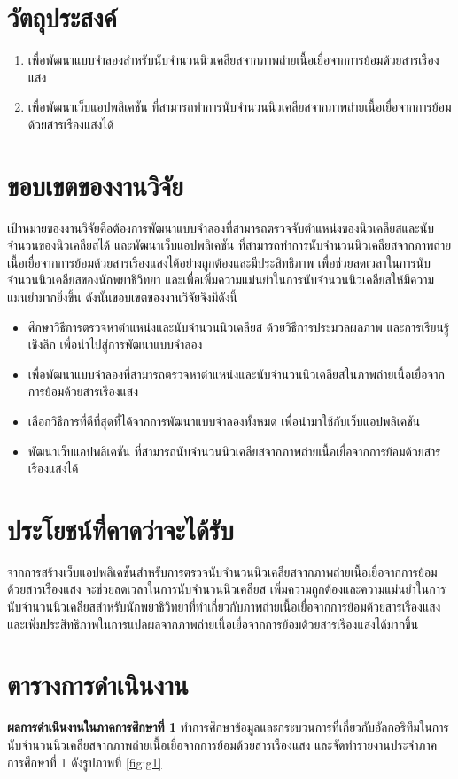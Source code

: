 \documentclass[12pt,oneside,openright,a4paper]{cpe-thai-project}
\begin{document}
\section{วัตถุประสงค์}
\begin{enumerate}
 	\item เพื่อพัฒนาแบบจำลองสำหรับนับจำนวนนิวเคลียสจากภาพถ่ายเนื้อเยื่อจากการย้อมด้วยสารเรืองแสง
	\item เพื่อพัฒนาเว็บแอปพลิเคชัน ที่สามารถทำการนับจำนวนนิวเคลียสจากภาพถ่ายเนื้อเยื่อจากการย้อมด้วยสารเรืองแสงได้
\end{enumerate}
\section{ขอบเขตของงานวิจัย}
เป้าหมายของงานวิจัยคือต้องการพัฒนาแบบจำลองที่สามารถตรวจจับตำแหน่งของนิวเคลียสและนับจำนวนของนิวเคลียสได้ และพัฒนาเว็บแอปพลิเคชัน ที่สามารถทำการนับจำนวนนิวเคลียสจากภาพถ่ายเนื้อเยื่อจากการย้อมด้วยสารเรืองแสงได้อย่างถูกต้องและมีประสิทธิภาพ เพื่อช่วยลดเวลาในการนับจำนวนนิวเคลียสของนักพยาธิวิทยา และเพื่อเพิ่มความแม่นยำในการนับจำนวนนิวเคลียสให้มีความแม่นยำมากยิ่งขึ้น ดังนั้นขอบเขตของงานวิจัยจึงมีดังนี้
\begin{itemize}
	\item ศึกษาวิธีการตรวจหาตำแหน่งและนับจำนวนนิวเคลียส ด้วยวิธีการประมวลผลภาพ และการเรียนรู้เชิงลึก เพื่อนำไปสู่การพัฒนาแบบจำลอง
    \item เพื่อพัฒนาแบบจำลองที่สามารถตรวจหาตำแหน่งและนับจำนวนนิวเคลียสในภาพถ่ายเนื้อเยื่อจากการย้อมด้วยสารเรืองแสง
    \item เลือกวิธีการที่ดีที่สุดที่ได้จากการพัฒนาแบบจำลองทั้งหมด เพื่อนำมาใช้กับเว็บแอปพลิเคชัน
	\item พัฒนาเว็บแอปพลิเคชัน ที่สามารถนับจำนวนนิวเคลียสจากภาพถ่ายเนื้อเยื่อจากการย้อมด้วยสารเรืองแสงได้
\end{itemize}
\section{ประโยชน์ที่คาดว่าจะได้รับ}
จากการสร้างเว็บแอปพลิเคชันสำหรับการตรวจนับจำนวนนิวเคลียสจากภาพถ่ายเนื้อเยื่อจากการย้อมด้วยสารเรืองแสง จะช่วยลดเวลาในการนับจำนวนนิวเคลียส เพิ่มความถูกต้องและความแม่นยำในการนับจำนวนนิวเคลียสสำหรับนักพยาธิวิทยาที่ทำเกี่ยวกับภาพถ่ายเนื้อเยื่อจากการย้อมด้วยสารเรืองแสงและเพิ่มประสิทธิภาพในการแปลผลจากภาพถ่ายเนื้อเยื่อจากการย้อมด้วยสารเรืองแสงได้มากขึ้น 
\section{ตารางการดำเนินงาน}
\textbf{ผลการดำเนินงานในภาคการศึกษาที่ 1} ทำการศึกษาข้อมูลและกระบวนการที่เกี่ยวกับอัลกอริทึมในการนับจำนวนนิวเคลียสจากภาพถ่ายเนื้อเยื่อจากการย้อมด้วยสารเรืองแสง และจัดทำรายงานประจําภาคการศึกษาที่ 1 ดังรูปภาพที่ \ref{fig:g1}
\end{document}
